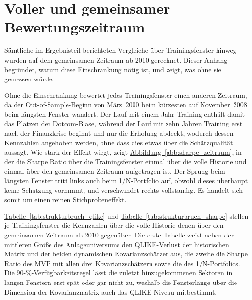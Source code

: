 \documentclass[12pt,a4paper]{article}
\begin{document}
\newpage
\appendix
\section{Voller und gemeinsamer Bewertungszeitraum}\label{sec:anhang_strukturbruch}
Sämtliche im Ergebnisteil berichteten Vergleiche über Trainingsfenster hinweg wurden auf dem gemeinsamen Zeitraum ab 2010 gerechnet.
Dieser Anhang begründet, warum diese Einschränkung nötig ist, und zeigt, was ohne sie gemessen würde.

Ohne die Einschränkung bewertet jedes Trainingsfenster einen anderen Zeitraum, da der Out-of-Sample-Beginn von März~2000 beim kürzesten auf November~2008 beim längsten Fenster wandert.
Der Lauf mit einem Jahr Training enthält damit das Platzen der Dotcom-Blase, während der Lauf mit zehn Jahren Training erst nach der Finanzkrise beginnt und nur die Erholung abdeckt, wodurch dessen Kennzahlen angehoben werden, ohne dass dies etwas über die Schätzqualität aussagt.
Wie stark der Effekt wiegt, zeigt \hyperref[abb:sharpe_zeitraum]{Abbildung~\ref*{abb:sharpe_zeitraum}}, in der die Sharpe Ratio über die Trainingsfenster einmal über die volle Historie und einmal über den gemeinsamen Zeitraum aufgetragen ist.
Der Sprung beim längsten Fenster tritt links auch beim 1/N-Portfolio auf, obwohl dieses überhaupt keine Schätzung vornimmt, und verschwindet rechts vollständig.
Es handelt sich somit um einen reinen Stichprobeneffekt.



\hyperref[tab:strukturbruch_qlike]{Tabelle~\ref*{tab:strukturbruch_qlike}} und \hyperref[tab:strukturbruch_sharpe]{Tabelle~\ref*{tab:strukturbruch_sharpe}} stellen je Trainingsfenster die Kennzahlen über die volle Historie denen über den gemeinsamen Zeitraum ab 2010 gegenüber.
Die erste Tabelle weist neben der mittleren Größe des Anlageuniversums den QLIKE-Verlust der historischen Matrix und der beiden dynamischen Kovarianzschätzer aus, die zweite die Sharpe Ratio des MVP mit allen drei Kovarianzschätzern sowie die des 1/N-Portfolios.
Die 90-\%-Verfügbarkeitsregel lässt die zuletzt hinzugekommenen Sektoren in langen Fenstern erst spät oder gar nicht zu, weshalb die Fensterlänge über die Dimension der Kovarianzmatrix auch das QLIKE-Niveau mitbestimmt.




\end{document}
